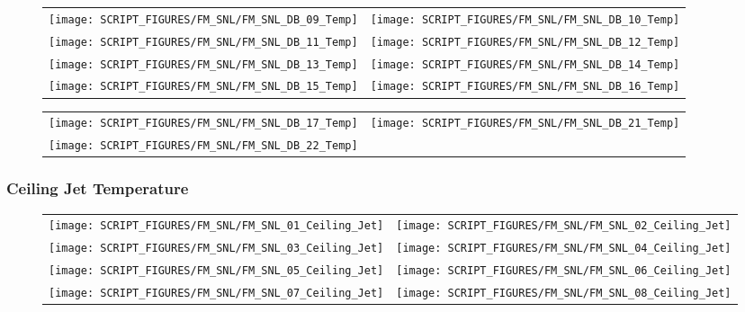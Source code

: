 \begin{figure}[p]
\begin{tabular*}{\textwidth}{l@{\extracolsep{\fill}}r}
\texttt{[image: SCRIPT\_FIGURES/FM\_SNL/FM\_SNL\_DB\_09\_Temp]} &
\texttt{[image: SCRIPT\_FIGURES/FM\_SNL/FM\_SNL\_DB\_10\_Temp]} \\
\texttt{[image: SCRIPT\_FIGURES/FM\_SNL/FM\_SNL\_DB\_11\_Temp]} &
\texttt{[image: SCRIPT\_FIGURES/FM\_SNL/FM\_SNL\_DB\_12\_Temp]} \\
\texttt{[image: SCRIPT\_FIGURES/FM\_SNL/FM\_SNL\_DB\_13\_Temp]} &
\texttt{[image: SCRIPT\_FIGURES/FM\_SNL/FM\_SNL\_DB\_14\_Temp]} \\
\texttt{[image: SCRIPT\_FIGURES/FM\_SNL/FM\_SNL\_DB\_15\_Temp]} &
\texttt{[image: SCRIPT\_FIGURES/FM\_SNL/FM\_SNL\_DB\_16\_Temp]}
\end{tabular*}
\end{figure}

\begin{figure}[p]
\begin{tabular*}{\textwidth}{l@{\extracolsep{\fill}}r}
\texttt{[image: SCRIPT\_FIGURES/FM\_SNL/FM\_SNL\_DB\_17\_Temp]} &
\texttt{[image: SCRIPT\_FIGURES/FM\_SNL/FM\_SNL\_DB\_21\_Temp]} \\
\texttt{[image: SCRIPT\_FIGURES/FM\_SNL/FM\_SNL\_DB\_22\_Temp]}
\end{tabular*}
\end{figure}

\clearpage

\subsubsection{Ceiling Jet Temperature}

\begin{figure}[p]
\begin{tabular*}{\textwidth}{l@{\extracolsep{\fill}}r}
\texttt{[image: SCRIPT\_FIGURES/FM\_SNL/FM\_SNL\_01\_Ceiling\_Jet]} &
\texttt{[image: SCRIPT\_FIGURES/FM\_SNL/FM\_SNL\_02\_Ceiling\_Jet]} \\
\texttt{[image: SCRIPT\_FIGURES/FM\_SNL/FM\_SNL\_03\_Ceiling\_Jet]} &
\texttt{[image: SCRIPT\_FIGURES/FM\_SNL/FM\_SNL\_04\_Ceiling\_Jet]} \\
\texttt{[image: SCRIPT\_FIGURES/FM\_SNL/FM\_SNL\_05\_Ceiling\_Jet]} &
\texttt{[image: SCRIPT\_FIGURES/FM\_SNL/FM\_SNL\_06\_Ceiling\_Jet]} \\
\texttt{[image: SCRIPT\_FIGURES/FM\_SNL/FM\_SNL\_07\_Ceiling\_Jet]} &
\texttt{[image: SCRIPT\_FIGURES/FM\_SNL/FM\_SNL\_08\_Ceiling\_Jet]}
\end{tabular*}
\end{figure}

